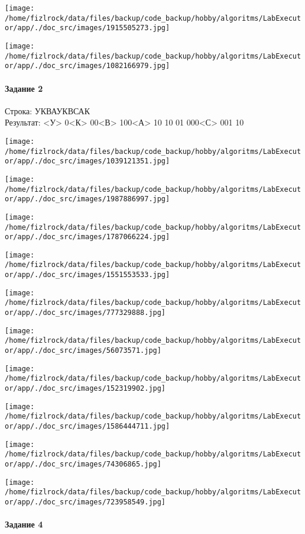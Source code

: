 \documentclass[a4paper, 12pt]{article}
\begin{document}
\texttt{[image: /home/fizlrock/data/files/backup/code\_backup/hobby/algoritms/LabExecutor/app/./doc\_src/images/1915505273.jpg]}

\texttt{[image: /home/fizlrock/data/files/backup/code\_backup/hobby/algoritms/LabExecutor/app/./doc\_src/images/1082166979.jpg]}
\pagebreak
\paragraph{Задание 2}

Строка: 
УКВАУКВСАК\\
Результат: <У> 0<К> 00<В> 100<А> 10 10 01 000<С> 001 10

\texttt{[image: /home/fizlrock/data/files/backup/code\_backup/hobby/algoritms/LabExecutor/app/./doc\_src/images/1039121351.jpg]}

\texttt{[image: /home/fizlrock/data/files/backup/code\_backup/hobby/algoritms/LabExecutor/app/./doc\_src/images/1987886997.jpg]}

\texttt{[image: /home/fizlrock/data/files/backup/code\_backup/hobby/algoritms/LabExecutor/app/./doc\_src/images/1787066224.jpg]}

\texttt{[image: /home/fizlrock/data/files/backup/code\_backup/hobby/algoritms/LabExecutor/app/./doc\_src/images/1551553533.jpg]}

\texttt{[image: /home/fizlrock/data/files/backup/code\_backup/hobby/algoritms/LabExecutor/app/./doc\_src/images/777329888.jpg]}

\texttt{[image: /home/fizlrock/data/files/backup/code\_backup/hobby/algoritms/LabExecutor/app/./doc\_src/images/56073571.jpg]}

\texttt{[image: /home/fizlrock/data/files/backup/code\_backup/hobby/algoritms/LabExecutor/app/./doc\_src/images/152319902.jpg]}

\texttt{[image: /home/fizlrock/data/files/backup/code\_backup/hobby/algoritms/LabExecutor/app/./doc\_src/images/1586444711.jpg]}

\texttt{[image: /home/fizlrock/data/files/backup/code\_backup/hobby/algoritms/LabExecutor/app/./doc\_src/images/74306865.jpg]}

\texttt{[image: /home/fizlrock/data/files/backup/code\_backup/hobby/algoritms/LabExecutor/app/./doc\_src/images/723958549.jpg]}
\pagebreak
\paragraph{Задание 4}
\end{document}
